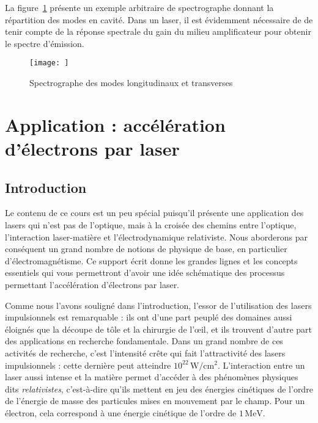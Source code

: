 \documentclass[a4paper]{book}
\begin{document}
La figure~\ref{fig:modes_long_et_trans} présente un exemple arbitraire de spectrographe donnant la répartition des modes en cavité. Dans un laser, il est évidemment nécessaire de de tenir compte de la réponse spectrale du gain du milieu amplificateur pour obtenir le spectre d'émission.

\begin{figure}[!htbp]
\begin{center}
\texttt{[image: ]}
\end{center}
\caption{Spectrographe des modes longitudinaux et transverses}
\label{fig:modes_long_et_trans}
\end{figure}

\chapter{Application : accélération d'électrons par laser}

\section{Introduction}
Le contenu de ce cours est un peu spécial puisqu'il présente une application des lasers qui n'est pas de l'optique, mais à la croisée des chemins entre l'optique, l'interaction laser-matière et l'électrodynamique relativiste. Nous aborderons par conséquent un grand nombre de notions de physique de base, en particulier d'électromagnétisme. Ce support écrit donne les grandes lignes et les concepts essentiels qui vous permettront d'avoir une idée schématique des processus permettant l'accélération d'électrons par laser. 

Comme nous l'avons souligné dans l'introduction, l'essor de l'utilisation des lasers impulsionnels est remarquable : ils ont d'une part peuplé des domaines aussi éloignés que la découpe de tôle et la chirurgie de l'\oe{}il, et ils trouvent d'autre part des applications en recherche fondamentale. Dans un grand nombre de ces activités de recherche, c'est l'intensité crête qui fait l'attractivité des lasers impulsionnels : cette dernière peut atteindre $10^{22}\,\mathrm{W/cm^2}$. L'interaction entre un laser aussi intense et la matière permet d'accéder à des phénomènes physiques dits \textit{relativistes}, c'est-à-dire qu'ils mettent en jeu des énergies cinétiques de l'ordre de l'énergie de masse des particules mises en mouvement par le champ. Pour un électron, cela correspond à une énergie cinétique de l'ordre de $1\,\mathrm{MeV}$. 
\end{document}
